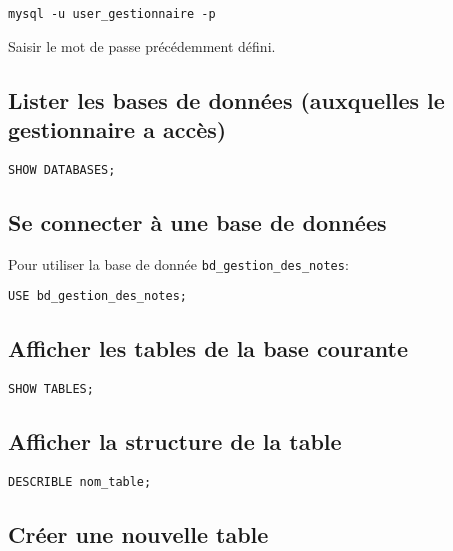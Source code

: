 \documentclass[11pt]{article}
\begin{document}
\begin{verbatim}
mysql -u user_gestionnaire -p
\end{verbatim}

Saisir le mot de passe précédemment défini. 

\subsection{Lister les bases de données (auxquelles le gestionnaire a accès)}
\label{sec:org9ea8a51}

\begin{verbatim}
SHOW DATABASES;
\end{verbatim}

\subsection{Se connecter à une base de données}
\label{sec:orga48b96b}
Pour utiliser la base de donnée \texttt{bd\_gestion\_des\_notes}:

\begin{verbatim}
USE bd_gestion_des_notes;      
\end{verbatim}

\subsection{Afficher les tables de la base courante}
\label{sec:org88b4c21}

\begin{verbatim}
SHOW TABLES;
\end{verbatim}

\subsection{Afficher la structure de la table}
\label{sec:orgaf64954}

\begin{verbatim}
DESCRIBLE nom_table;
\end{verbatim}

\subsection{Créer une nouvelle table}
\label{sec:org9a37a76}
\end{document}
